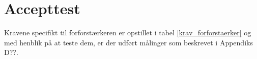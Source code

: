 \section{Accepttest}
\label{forforstaerker_accepttest}

Kravene specifikt til forforstærkeren er opstillet i tabel \ref{krav_forforstaerker} og med henblik på at teste dem, er der udført målinger som beskrevet i Appendiks D??. 